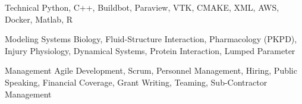 
\begin{cvskills}
  \cvskill
    {Technical} %
    {Python, C++, Buildbot, Paraview, VTK, CMAKE, XML, AWS, Docker, Matlab, R} %

  \cvskill
    {Modeling} %
    {Systems Biology, Fluid-Structure Interaction, Pharmacology (PKPD), Injury Physiology, Dynamical Systems, Protein Interaction, Lumped Parameter} %

    \cvskill
    {Management} %
    {Agile Development, Scrum, Personnel Management, Hiring, Public Speaking, Financial Coverage, Grant Writing, Teaming, Sub-Contractor Management} %
\end{cvskills}
